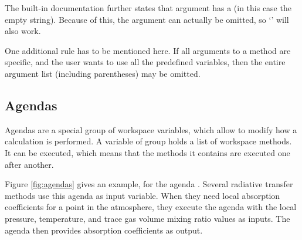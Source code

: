 The built-in documentation further states that argument
 has a  (in this case the
empty string). Because of this, the argument can actually be omitted,
so `' will also work.

One additional rule has to be mentioned here. If all arguments to a
method are specific, and the user wants to use all the predefined
variables, then the entire argument list (including parentheses) may
be omitted. 


\subsection{Agendas}
\label{sec:agendas}
%
Agendas are a special group of workspace variables, which allow to
modify how a calculation is performed. A variable of group
 holds a list of workspace methods. It can be
executed, which means that the methods it contains are executed one
after another.

Figure \ref{fig:agendas} gives an example, for the agenda
. Several radiative transfer methods use this
agenda as input variable. When they need local absorption coefficients for a
point in the atmosphere, they execute the agenda with the local pressure,
temperature, and trace gas volume mixing ratio values as inputs. The agenda
then provides absorption coefficients as output.

